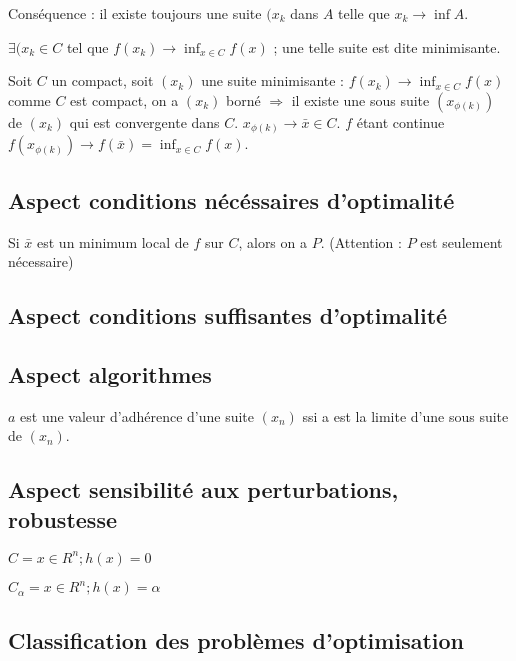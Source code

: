 	Conséquence : il existe toujours une suite $(x_k$ dans $A$ telle que $x_k \rightarrow \inf A$.
	
	\begin{definition} $\exists (x_k \in C$ tel que $f(x_k) \rightarrow \inf_{x \in C} f(x)$ ; une telle suite est dite minimisante.
	\end{definition}
	
	Soit $C$ un compact, soit $(x_k)$ une suite minimisante : $f(x_k) \rightarrow \inf_{x \in C} f(x)$ comme $C$ est compact, on a $(x_k)$ borné $\Rightarrow$ il existe une sous suite $(x_{\phi(k)})$ de $(x_k)$ qui est convergente dans $C$. $x_{\phi(k)} \rightarrow \bar{x} \in C$. $f$ étant continue $f(x_{\phi(k)}) \rightarrow f(\bar{x}) = \inf_{x \in C} f(x)$.
	
	\subsection{Aspect \og conditions nécéssaires d'optimalité\fg}
	
	Si $\bar{x}$ est un minimum local de $f$ sur $C$, alors on a $P$. (Attention : $P$ est seulement nécessaire)
	
	\subsection{Aspect \og conditions suffisantes d'optimalité\fg}
	
	\subsection{Aspect \og algorithmes \fg}
	
	$a$ est une valeur d'adhérence d'une suite $(x_n)$ ssi a est la limite d'une sous suite de $(x_n)$.
	
	\subsection{Aspect \og sensibilité aux perturbations, robustesse \fg}
	
	$C = {x\in R^n ; h(x) = 0}$
	
	$C_\alpha = {x\in R^n ; h(x) = \alpha}$
	
	\subsection{Classification des problèmes d'optimisation}
	
